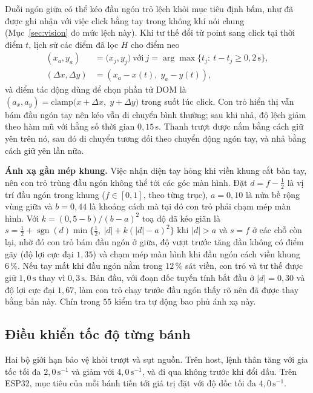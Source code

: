 \documentclass[5p,twocolumn]{elsarticle}
\begin{document}
Duỗi ngón giữa có thể kéo đầu ngón trỏ lệch khỏi mục tiêu định bấm, như đã được ghi nhận với việc click bằng tay trong không khí nói chung \cite{vogel2005} (Mục~\ref{sec:vision} đo mức lệch này). Khi tư thế đổi từ point sang click tại thời điểm $t$, lịch sử các điểm đã lọc $H$ cho điểm neo
\begin{align}
(x_a,y_a)&=\bigl(x_j,y_j\bigr)\ \text{với}\ j=\arg\max\{t_j:\ t-t_j\ge 0{,}2\,\mathrm{s}\},\nonumber\\
(\Delta x,\Delta y)&=(x_a-x(t),\;y_a-y(t)),\label{eq:anchor}
\end{align}
và điểm tác động dùng để chọn phần tử DOM là $(a_x,a_y)=\mathrm{clamp}\bigl(x+\Delta x,\;y+\Delta y\bigr)$ trong suốt lúc click. Con trỏ hiển thị vẫn bám đầu ngón tay nên kéo vẫn di chuyển bình thường; sau khi nhả, độ lệch giảm theo hàm mũ với hằng số thời gian $0{,}15$\,s. Thanh trượt được nắm bằng cách giữ yên trên nó, sau đó di chuyển tương đối theo chuyển động ngón tay, và nhả bằng cách giữ yên lần nữa.

\textbf{Ánh xạ gần mép khung.}\label{sec:edge} Việc nhận diện tay hỏng khi viền khung cắt bàn tay, nên con trỏ trùng đầu ngón không thể tới các góc màn hình. Đặt $d=f-\tfrac12$ là vị trí đầu ngón trong khung ($f\in[0,1]$, theo từng trục), $a=0{,}10$ là nửa bề rộng vùng giữa và $b=0{,}44$ là khoảng cách mà tại đó con trỏ phải chạm mép màn hình. Với $k=(0{,}5-b)/(b-a)^2$ toạ độ đã kéo giãn là $s=\tfrac12+\operatorname{sgn}(d)\min\{\tfrac12,\ |d|+k(|d|-a)^2\}$ khi $|d|>a$ và $s=f$ ở các chỗ còn lại, nhờ đó con trỏ bám đầu ngón ở giữa, độ vượt trước tăng dần không có điểm gãy (độ lợi cực đại $1{,}35$) và chạm mép màn hình khi đầu ngón cách viền khung $6\,\%$. Nếu tay mất khi đầu ngón nằm trong $12\,\%$ sát viền, con trỏ và tư thế được giữ $1{,}0\,\mathrm{s}$ thay vì $0{,}3\,\mathrm{s}$. Bản đầu, với đoạn dốc tuyến tính bắt đầu ở $|d|=0{,}30$ và độ lợi cực đại $1{,}67$, làm con trỏ chạy trước đầu ngón thấy rõ nên đã được thay bằng bản này. Chín trong $55$ kiểm tra tự động bao phủ ánh xạ này.

\subsection{Điều khiển tốc độ từng bánh}\label{sec:wheelctrl}
Hai bộ giới hạn bảo vệ khỏi trượt và sụt nguồn. Trên host, lệnh thân tăng với gia tốc tối đa $2{,}0\,\mathrm{s^{-1}}$ và giảm với $4{,}0\,\mathrm{s^{-1}}$, và đi qua không trước khi đổi dấu. Trên ESP32, mục tiêu của mỗi bánh tiến tới giá trị đặt với độ dốc tối đa $4{,}0\,\mathrm{s^{-1}}$.
\end{document}
